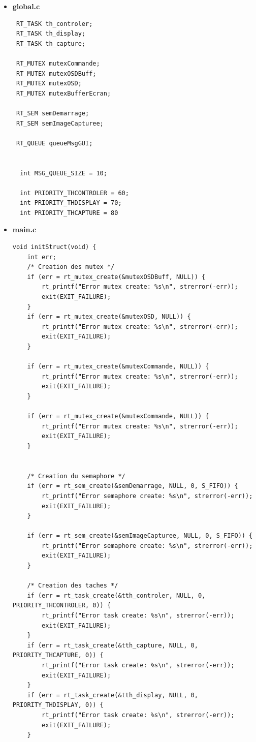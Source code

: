 \documentclass[11pt, a4paper]{paper}
\begin{document}
\begin{itemize}
\begin{lstlisting}
 /* @constantes */
 extern int MSG_QUEUE_SIZE;
 extern int PRIORITY_THCONTROLER;
 extern int PRIORITY_THCAPTURE;
 extern int PRIORITY_THDISPLAY;
\end{lstlisting}


\item \large{\bf global.c}

\lstset{language=C} 
\begin{lstlisting}
 RT_TASK th_controler;
 RT_TASK th_display;
 RT_TASK th_capture;

 RT_MUTEX mutexCommande;
 RT_MUTEX mutexOSDBuff;
 RT_MUTEX mutexOSD;
 RT_MUTEX mutexBufferEcran;

 RT_SEM semDemarrage;
 RT_SEM semImageCapturee;

 RT_QUEUE queueMsgGUI;


  int MSG_QUEUE_SIZE = 10;

  int PRIORITY_THCONTROLER = 60;
  int PRIORITY_THDISPLAY = 70;
  int PRIORITY_THCAPTURE = 80
\end{lstlisting}

\item \large{\bf main.c}

\lstset{language=C} 
\begin{lstlisting}
void initStruct(void) {
    int err;
    /* Creation des mutex */
    if (err = rt_mutex_create(&mutexOSDBuff, NULL)) {
        rt_printf("Error mutex create: %s\n", strerror(-err));
        exit(EXIT_FAILURE);
    }
    if (err = rt_mutex_create(&mutexOSD, NULL)) {
        rt_printf("Error mutex create: %s\n", strerror(-err));
        exit(EXIT_FAILURE);
    }

    if (err = rt_mutex_create(&mutexCommande, NULL)) {
        rt_printf("Error mutex create: %s\n", strerror(-err));
        exit(EXIT_FAILURE);
    }

    if (err = rt_mutex_create(&mutexCommande, NULL)) {
        rt_printf("Error mutex create: %s\n", strerror(-err));
        exit(EXIT_FAILURE);
    }


    /* Creation du semaphore */
    if (err = rt_sem_create(&semDemarrage, NULL, 0, S_FIFO)) {
        rt_printf("Error semaphore create: %s\n", strerror(-err));
        exit(EXIT_FAILURE);
    }

    if (err = rt_sem_create(&semImageCapturee, NULL, 0, S_FIFO)) {
        rt_printf("Error semaphore create: %s\n", strerror(-err));
        exit(EXIT_FAILURE);
    }

    /* Creation des taches */
    if (err = rt_task_create(&tth_controler, NULL, 0, PRIORITY_THCONTROLER, 0)) {
        rt_printf("Error task create: %s\n", strerror(-err));
        exit(EXIT_FAILURE);
    }
    if (err = rt_task_create(&tth_capture, NULL, 0, PRIORITY_THCAPTURE, 0)) {
        rt_printf("Error task create: %s\n", strerror(-err));
        exit(EXIT_FAILURE);
    }
    if (err = rt_task_create(&tth_display, NULL, 0, PRIORITY_THDISPLAY, 0)) {
        rt_printf("Error task create: %s\n", strerror(-err));
        exit(EXIT_FAILURE);
    }



\end{lstlisting}
\end{itemize}
\end{document}
